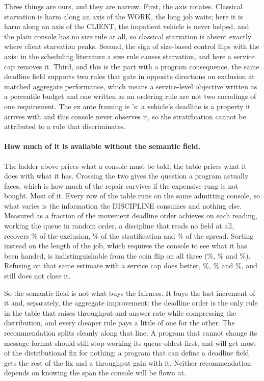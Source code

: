 \documentclass[11pt]{article}
\begin{document}
Three things are ours, and they are narrow. First, the axis rotates. Classical starvation is harm
along an axis of the WORK, the long job waits; here it is harm along an axis of the CLIENT, the
impatient vehicle is never helped, and the plain console has no size rule at all, so classical
starvation is absent exactly where client starvation peaks. Second, the sign of size-based control
flips with the axis: in the scheduling literature a size rule causes starvation, and here a service
cap removes it. Third, and this is the part with a program consequence, the same deadline field
supports two rules that gate in opposite directions on exclusion at matched aggregate performance,
which means a service-level objective written as a percentile budget and one written as an ordering
rule are not two encodings of one requirement. The ex ante framing is
\citet{liu2023segmentation}'s: a vehicle's deadline is a property it arrives with and this console
never observes it, so the stratification cannot be attributed to a rule that discriminates.

\paragraph{How much of it is available without the semantic field.} The ladder above prices what a
console must be told; the table prices what it does with what it has. Crossing the two gives the
question a program actually faces, which is how much of the repair survives if the expensive rung is
not bought. Most of it. Every row of the table runs on the same admitting console, so what varies is
the information the DISCIPLINE consumes and nothing else. Measured as a fraction of the movement
deadline order achieves on each reading, working the queue in random order, a discipline that reads
no field at all, recovers \FxRandStarv\% of the exclusion, \FxRandRatio\% of the stratification
and \FxRandIqr\% of the spread. Sorting instead on the length of the job, which requires the
console to see what it has been handed, is indistinguishable from the coin flip on all three
(\FxEasyStarv\%, \FxEasyRatio\% and \FxEasyIqr\%). Refusing on that same estimate with a service
cap does better, \FxCapStarv\%, \FxCapRatio\% and \FxCapIqr\%, and still does not close it.

So the semantic field is not what buys the fairness. It buys the last increment of it and, separately,
the aggregate improvement: the deadline order is the only rule in the table that raises throughput and
answer rate while compressing the distribution, and every cheaper rule pays a little of one for the
other. The recommendation splits cleanly along that line. A program that cannot change its message
format should still stop working its queue oldest-first, and will get most of the distributional fix
for nothing; a program that can define a deadline field gets the rest of the fix and a throughput
gain with it. Neither recommendation depends on knowing the span the console will be flown at.
\end{document}
